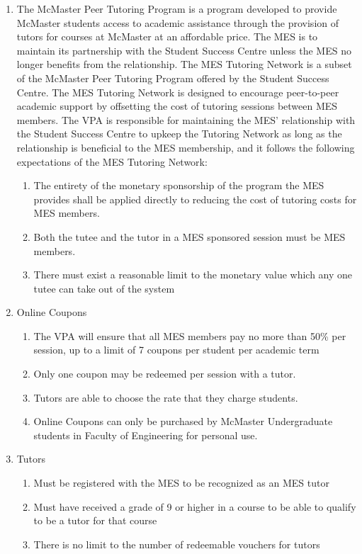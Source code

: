 \begin{enumerate}
 \item
  The McMaster Peer Tutoring Program is a program developed to provide McMaster students access to academic assistance through the provision of tutors for courses at McMaster at an affordable price. The MES is to maintain its partnership with the Student Success Centre unless the MES no longer benefits from the relationship. The MES Tutoring Network is a subset of the McMaster Peer Tutoring Program offered by the Student Success Centre. The MES Tutoring Network is designed to encourage peer-to-peer academic support by offsetting the cost of tutoring sessions between MES members. The VPA is responsible for maintaining the MES' relationship with the Student Success Centre to upkeep the Tutoring Network as long as the relationship is beneficial to the MES membership, and it follows the following expectations of the MES Tutoring Network:

  \begin{enumerate}
   \item
    The entirety of the monetary sponsorship of the program the MES provides shall be applied directly to reducing the cost of tutoring costs for MES members.
   \item
    Both the tutee and the tutor in a MES sponsored session must be MES members.
   \item
    There must exist a reasonable limit to the monetary value which any one tutee can take out of the system
  \end{enumerate}
 \item
  Online Coupons

  \begin{enumerate}
   \item
    The VPA will ensure that all MES members pay no more than 50\% per session, up to a limit of 7 coupons per student per academic term
   \item
    Only one coupon may be redeemed per session with a tutor. 
   \item
    Tutors are able to choose the rate that they charge students. 
   \item
    Online Coupons can only be purchased by McMaster Undergraduate students in Faculty of Engineering for personal use.
  \end{enumerate}
 \item
  Tutors

  \begin{enumerate}
   \item
    Must be registered with the MES to be recognized as an MES tutor
   \item
    Must have received a grade of 9 or higher in a course to be able to qualify to be a tutor for that course
   \item
    There is no limit to the number of redeemable vouchers for tutors
  \end{enumerate}

\end{enumerate}

